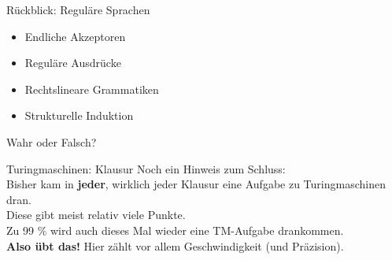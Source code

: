 
\begin{frame}{Rückblick: Reguläre Sprachen}
	\begin{itemize}[<+->]
		\item Endliche Akzeptoren
		\item Reguläre Ausdrücke
		\item Rechtslineare Grammatiken
		\item Strukturelle Induktion
	\end{itemize}
\end{frame}

\begin{frame}{Wahr oder Falsch?}
	\begin{itemize}
	\end{itemize}
\end{frame}









\begin{frame}{Turingmaschinen: Klausur}
	Noch ein Hinweis zum Schluss:\\
	Bisher kam in \textbf{jeder}, wirklich jeder Klausur eine Aufgabe zu Turingmaschinen dran.\\
	Diese gibt meist relativ viele Punkte.\\
	
	\bigskip
	Zu 99 \% wird auch dieses Mal wieder eine TM-Aufgabe drankommen.\\
	\textbf{Also übt das!} Hier zählt vor allem Geschwindigkeit (und Präzision).
\end{frame}

